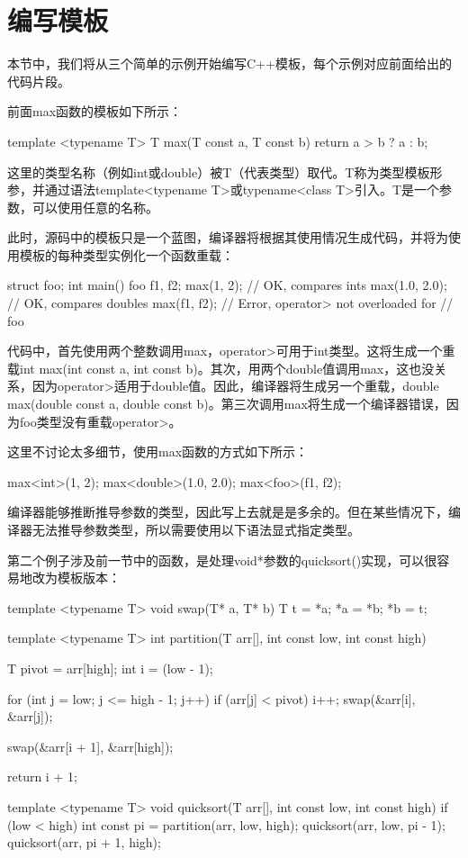 \section{编写模板}
本节中，我们将从三个简单的示例开始编写C++模板，每个示例对应前面给出的代码片段。

前面max函数的模板如下所示：

\begin{cpp}
template <typename T>
T max(T const a, T const b)
{
	return a > b ? a : b;
}
\end{cpp}

这里的类型名称（例如int或double）被T（代表类型）取代。T称为类型模板形参，并通过语法template<typename T>或typename<class T>引入。T是一个参数，可以使用任意的名称。

此时，源码中的模板只是一个蓝图，编译器将根据其使用情况生成代码，并将为使用模板的每种类型实例化一个函数重载：

\begin{cpp}
struct foo{};
int main()
{
	foo f1, f2;
	max(1, 2); // OK, compares ints
	max(1.0, 2.0); // OK, compares doubles
	max(f1, f2); // Error, operator> not overloaded for
	             // foo
}
\end{cpp}

代码中，首先使用两个整数调用max，operator>可用于int类型。这将生成一个重载int max(int const a, int const b)。其次，用两个double值调用max，这也没关系，因为operator>适用于double值。因此，编译器将生成另一个重载，double max(double const a, double const b)。第三次调用max将生成一个编译器错误，因为foo类型没有重载operator>。

这里不讨论太多细节，使用max函数的方式如下所示：

\begin{cpp}
max<int>(1, 2);
max<double>(1.0, 2.0);
max<foo>(f1, f2);
\end{cpp}

编译器能够推断推导参数的类型，因此写上去就是是多余的。但在某些情况下，编译器无法推导参数类型，所以需要使用以下语法显式指定类型。

第二个例子涉及前一节中的函数，是处理void*参数的quicksort()实现，可以很容易地改为模板版本：

\begin{cpp}
template <typename T>
void swap(T* a, T* b)
{
	T t = *a;
	*a = *b;
	*b = t;
}

template <typename T>
int partition(T arr[], int const low, int const high)
{
	T pivot = arr[high];
	int i = (low - 1);
	
	for (int j = low; j <= high - 1; j++)
	{
		if (arr[j] < pivot)
		{
			i++;
			swap(&arr[i], &arr[j]);
		}
	}

	swap(&arr[i + 1], &arr[high]);
	
	return i + 1;
}

template <typename T>
void quicksort(T arr[], int const low, int const high)
{
	if (low < high)
	{
		int const pi = partition(arr, low, high);
		quicksort(arr, low, pi - 1);
		quicksort(arr, pi + 1, high);
	}
}
\end{cpp}

